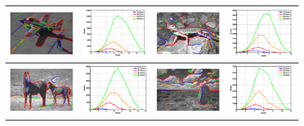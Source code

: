 \begin{figure}[ht]
\begin{tabular}{|cc|cc|}
\hline
\includegraphics[width=0.24\linewidth]{figs/37073_cons_stats.pdf} &
\includegraphics[width=0.24\linewidth]{figs/37073_stats.pdf} &
\includegraphics[width=0.24\linewidth]{figs/87046_cons_stats.pdf} &
\includegraphics[width=0.24\linewidth]{figs/87046_stats.pdf} \\
\hline
\includegraphics[width=0.24\linewidth]{figs/113016_cons_stats.pdf} &
\includegraphics[width=0.24\linewidth]{figs/113016_stats.pdf} &
\includegraphics[width=0.24\linewidth]{figs/216066_cons_stats.pdf} &
\includegraphics[width=0.24\linewidth]{figs/216066_stats.pdf} \\

\end{tabular}
\end{figure}
